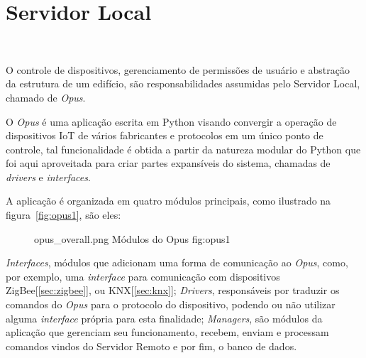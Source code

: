 \section{\textbf{Servidor Local}}
~\label{opus}

O controle de dispositivos, gerenciamento de permissões de usuário e abstração da estrutura de um edifício,
são responsabilidades assumidas pelo Servidor Local, chamado de \emph{Opus}.

O \emph{Opus} é uma aplicação escrita em Python visando convergir a operação de dispositivos IoT de vários
fabricantes e protocolos em um único ponto de controle, tal funcionalidade é obtida a partir da natureza modular
do Python que foi aqui aproveitada para criar partes expansíveis do sistema, chamadas de \emph{drivers} e \emph{interfaces}.

A aplicação é organizada em quatro módulos principais, como ilustrado na figura~\ref{fig:opus1}, são eles:
\begin{figure}[h!]
    {opus_overall.png}
    {Módulos do Opus}
    {fig:opus1}
\end{figure}

\emph{Interfaces}, módulos que adicionam uma forma de comunicação ao \emph{Opus}, como, por exemplo, uma \emph{interface} para comunicação com dispositivos ZigBee[\ref{sec:zigbee}], ou KNX[\ref{sec:knx}];
\emph{Drivers}, responsáveis por traduzir os comandos do \emph{Opus} para o protocolo do dispositivo, podendo ou não utilizar alguma \emph{interface} própria para esta finalidade;
\emph{Managers}, são módulos da aplicação que gerenciam seu funcionamento, recebem, enviam e processam comandos vindos do Servidor Remoto e por fim,
o banco de dados.
